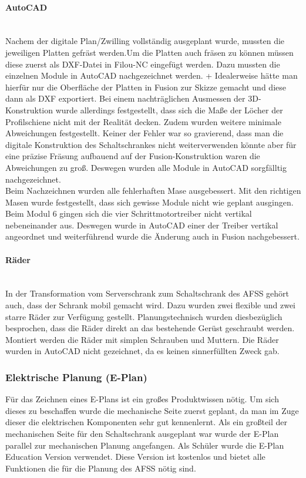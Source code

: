     \paragraph{AutoCAD}\mbox{}\\
    Nachem der digitale Plan/Zwilling vollständig ausgeplant wurde, mussten die jeweiligen Platten gefräst werden.Um die Platten auch fräsen zu können müssen diese zuerst als DXF-Datei in Filou-NC eingefügt werden. Dazu mussten die einzelnen Module in AutoCAD nachgezeichnet werden.     
+
    Idealerweise hätte man hierfür nur die Oberfläche der Platten in Fusion zur Skizze gemacht und diese dann als DXF exportiert. Bei einem nachträglichen Ausmessen der 3D-Konstruktion wurde allerdings festgestellt, dass sich die Maße der Löcher der Profilschiene nicht mit der Realität decken. Zudem wurden weitere minimale Abweichungen festgestellt. Keiner der Fehler war so gravierend, dass man die digitale Konstruktion des Schaltschrankes nicht weiterverwenden könnte aber für eine präzise Fräsung aufbauend auf der Fusion-Konstruktion waren die Abweichungen zu groß. Deswegen wurden alle Module in AutoCAD sorgfälltig nachgezeichnet.\\     
    Beim Nachzeichnen wurden alle fehlerhaften Mase ausgebessert. Mit den richtigen Masen wurde festgestellt, dass sich gewisse Module nicht wie geplant ausgingen. Beim Modul 6 gingen sich die vier Schrittmotortreiber nicht vertikal nebeneinander aus. Deswegen wurde in AutoCAD einer der Treiber vertikal angeordnet und weiterführend wurde die Änderung auch in Fusion nachgebessert.
    \paragraph{Räder}\mbox{}\\
    In der Transformation vom Serverschrank zum Schaltschrank des AFSS gehört auch, dass der Schrank mobil gemacht wird. Dazu wurden zwei flexible und zwei starre Räder zur Verfügung gestellt. Planungstechnisch wurden diesbezüglich besprochen, dass die Räder direkt an das bestehende Gerüst geschraubt werden. Montiert werden die Räder mit simplen Schrauben und Muttern. Die Räder wurden in AutoCAD nicht gezeichnet, da es keinen sinnerfüllten Zweck gab. 
\subsubsection{Elektrische Planung (E-Plan)}
\label{sec:Elektrische Planung}
    Für das Zeichnen eines E-Plans ist ein großes Produktwissen nötig. Um sich dieses zu beschaffen wurde die mechanische Seite zuerst geplant, da man im  Zuge dieser die elektrischen Komponenten sehr gut kennenlernt. Als ein großteil der mechanischen Seite für den Schaltschrank ausgeplant war wurde der E-Plan parallel zur mechanischen Planung angefangen. Als Schüler wurde die E-Plan Education Version verwendet. Diese Version ist kostenlos und bietet alle Funktionen die für die Planung des AFSS nötig sind.
